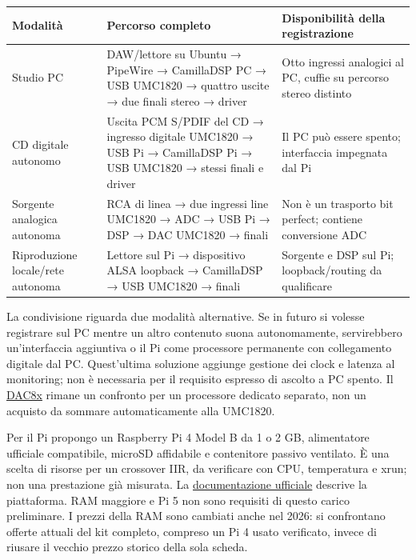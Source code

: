 \documentclass[
  italian,
  11pt,
  a4paper,
]{article}
\newcounter{none} %
\begin{document}
{\def\LTcaptype{none} %
\begin{longtable}[]{@{}
  >{\raggedright\arraybackslash}p{}
  >{\raggedright\arraybackslash}p{}
  >{\raggedright\arraybackslash}p{}@{}}
\toprule\noalign{}
\begin{minipage}[b]{\linewidth}\raggedright
Modalità
\end{minipage} & \begin{minipage}[b]{\linewidth}\raggedright
Percorso completo
\end{minipage} & \begin{minipage}[b]{\linewidth}\raggedright
Disponibilità della registrazione
\end{minipage} \\
\midrule\noalign{}
\endhead
\bottomrule\noalign{}
\endlastfoot
Studio PC & DAW/lettore su Ubuntu → PipeWire → CamillaDSP PC → USB UMC1820 → quattro uscite
→ due finali stereo → driver & Otto ingressi analogici al PC, cuffie su percorso stereo
distinto \\
CD digitale autonomo & Uscita PCM S/PDIF del CD → ingresso digitale UMC1820 → USB Pi →
CamillaDSP Pi → USB UMC1820 → stessi finali e driver & Il PC può essere spento; interfaccia
impegnata dal Pi \\
Sorgente analogica autonoma & RCA di linea → due ingressi line UMC1820 → ADC → USB Pi → DSP
→ DAC UMC1820 → finali & Non è un trasporto bit perfect; contiene conversione ADC \\
Riproduzione locale/rete autonoma & Lettore sul Pi → dispositivo ALSA loopback → CamillaDSP
→ USB UMC1820 → finali & Sorgente e DSP sul Pi; loopback/routing da qualificare \\
\end{longtable}
}

La condivisione riguarda due modalità alternative. Se in futuro si volesse registrare sul PC
mentre un altro contenuto suona autonomamente, servirebbero un'interfaccia aggiuntiva o il
Pi come processore permanente con collegamento digitale dal PC. Quest'ultima soluzione
aggiunge gestione dei clock e latenza al monitoring; non è necessaria per il requisito
espresso di ascolto a PC spento. Il
\href{https://www.hifiberry.com/docs/data-sheets/datasheet-dac8x/}{DAC8x} rimane un
confronto per un processore dedicato separato, non un acquisto da sommare automaticamente
alla UMC1820.

Per il Pi propongo un Raspberry Pi 4 Model B da 1 o 2 GB, alimentatore ufficiale
compatibile, microSD affidabile e contenitore passivo ventilato. È una scelta di risorse per
un crossover IIR, da verificare con CPU, temperatura e xrun; non una prestazione già
misurata. La
\href{https://www.raspberrypi.com/products/raspberry-pi-4-model-b/}{documentazione
ufficiale} descrive la piattaforma. RAM maggiore e Pi 5 non sono requisiti di questo carico
preliminare. I prezzi della RAM sono cambiati anche nel 2026: si confrontano offerte attuali
del kit completo, compreso un Pi 4 usato verificato, invece di riusare il vecchio prezzo
storico della sola scheda.
\end{document}

